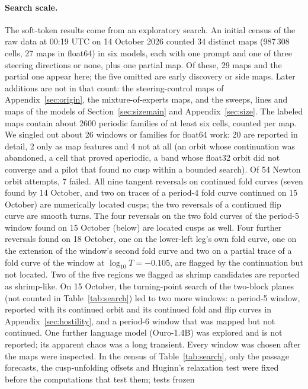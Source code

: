 \documentclass[11pt,letterpaper]{article}
\begin{document}
\paragraph{Search scale.} The soft-token results come from an exploratory search. An initial census of the raw
data at 00:19 UTC on 14 October 2026 counted 34 distinct maps (987\,308 cells, 27 maps in float64) in six models,
each with one prompt and one of three steering directions or none, plus one partial map. Of these, 29 maps and the
partial one appear here; the five omitted are early discovery or side maps. Later additions are not in that count:
the steering-control maps of Appendix~\ref{sec:origin}, the mixture-of-experts maps, and the sweeps, lines and maps of the models of Section~\ref{sec:sizemain} and Appendix~\ref{sec:size}.
The labeled maps contain about 2600 periodic families of at least six cells, counted per map. We singled out about
26 windows or families for float64 work: 20 are reported in detail, 2 only as map features and 4 not at all (an
orbit whose continuation was abandoned, a cell that proved aperiodic, a band whose float32 orbit did not converge and
a pilot that found no cusp within a bounded search). Of 54 Newton orbit attempts, 7 failed. All nine tangent
reversals on continued fold curves (seven found by 14 October, and two on traces of a period-4 fold curve continued on
15 October) are numerically located cusps; the two reversals of a continued flip curve are smooth turns. The four
reversals on the two fold curves of the period-5 window found on 15 October (below) are located cusps as well. Four
further reversals found on 18 October, one on the lower-left leg's own fold curve, one on the extension of the
window's second fold curve and two on a partial trace of a fold curve of the window at $\log_{10}T=-0.105$, are flagged
by the continuation but not located. Two of the five
regions we flagged as shrimp candidates are reported as shrimp-like. On 15 October, the turning-point search of the
two-block planes (not counted in Table~\ref{tab:search}) led to two more windows: a period-5 window, reported with its continued orbit and its continued fold and flip curves in
Appendix~\ref{sec:hostility}, and a period-6 window that was mapped but not continued. One further
language model (Ouro-1.4B) was explored and is not reported; its apparent chaos was a long transient. Every window
was chosen after the maps were inspected. In the census of Table~\ref{tab:search}, only the passage forecasts, the
cusp-unfolding offsets and Huginn's relaxation test were fixed before the computations that test them; tests frozen
\end{document}
